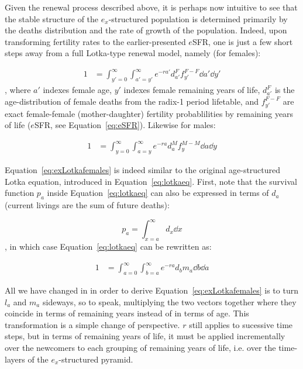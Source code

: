 Given the renewal process described above, it is perhaps now intuitive to see
that the stable structure of the $e_x$-structured population is determined
primarily by the deaths distribution and the rate of growth of the
population. Indeed, upon transforming fertility rates to the earlier-presented
$e$SFR, one is just a few short steps away from a full Lotka-type renewal
model, namely (for females):

\begin{align}
\label{eq:exLotkafemales}
1 &= \int _{y'=0}^\infty \int _{a'=y'}^\infty e^{-ra'} d_{a'}^F f_{y'}^{F-F} \dd
a' \dd y'
\end{align}
, where $a'$ indexes female age, $y'$ indexes female remaining years of life,
$d_{a'}^F$ is the age-distribution of female deaths from the radix-1 period
lifetable, and $f_{y'}^{F-F}$ are exact female-female (mother-daughter)
fertility probablilities by remaining years of life ($e$SFR, see Equation~\eqref{eq:eSFR}). Likewise for males:

\begin{align}
1 &= \int _{y=0}^\infty \int _{a=y}^\infty e^{-ra} d_a^M f_y^{M-M} \dd a \dd y
\end{align}

Equation~\ref{eq:exLotkafemales} is indeed similar to the
original age-structured Lotka equation, introduced in
Equation~\eqref{eq:lotkaeq}. First, note that the survival function $p_a$
inside Equation~\ref{eq:lotkaeq} can also be expressed in terms of
$d_a$ (current livings are the sum of future deaths):

\begin{equation}
p_a = \int _{x = a} ^\infty d_x \dd x
\end{equation}
, in which case Equation~\ref{eq:lotkaeq} can be rewritten as:

\begin{align}
\label{eq:lotkadx}
1 &= \int _{a=0}^\infty \int _{b = a}^\infty e^{-ra} d_b m_a \dd b \dd a
\end{align}

All we have changed in in order to derive Equation~\ref{eq:exLotkafemales}
is to turn $l_a$ and $m_a$ sideways, so to speak, multiplying the two vectors
together where they coincide in terms of remaining years instead of in terms of age. This
transformation is a simple change of perspective. $r$ still applies to sucessive 
time steps, but in terms of remaining years of life, it must be applied incrementally 
over the newcomers to
each grouping of remaining years of life, i.e. over the time-layers of the
$e_x$-structured pyramid.
